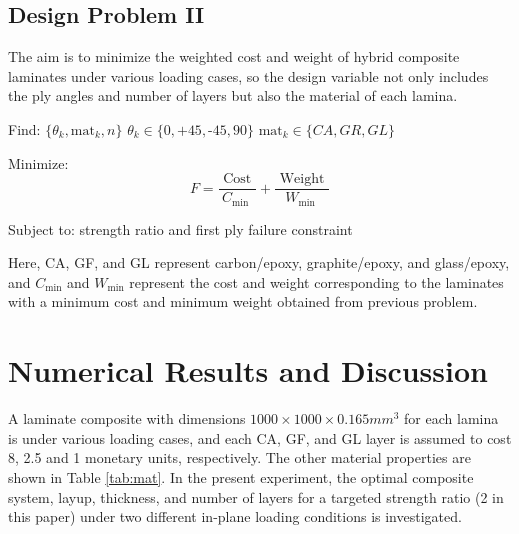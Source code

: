 \documentclass[USenglish]{article}
\begin{document}
\subsection{Design Problem II}
The aim is to minimize the weighted cost and weight of hybrid composite
laminates under various loading cases, so the design variable not only includes
the ply angles and number of layers but also the material of each lamina.


Find: $\{\theta_k,\text{mat}_k, n\}$ $\theta_k \in \{ 0,\text{+}45,\text{-}45,90\}$ $\text{mat}_k \in \{CA, GR, GL \}$

Minimize:
\begin{equation}
	F=\frac{\text { Cost }}{C_{\text {min }}}+\frac{\text { Weight }}{W_{\text {min }}}
\end{equation}

Subject to: strength ratio and first ply failure constraint


Here, CA, GF, and GL represent carbon/epoxy, graphite/epoxy, and glass/epoxy, and
$C_{\text{min}}$ and $W_{\text{min}}$ represent the cost and
weight corresponding to the laminates with a minimum cost and minimum weight
obtained from previous problem.

\section{Numerical Results and Discussion}
A laminate composite with dimensions $1000 \times 1000 \times 0.165 mm^3$ for
each lamina is under various loading cases, and each CA, GF, and GL layer is
assumed to cost 8, 2.5 and 1 monetary units, respectively. The other
material properties are shown in Table \ref{tab:mat}. In the present
experiment, the optimal composite system, layup, thickness, and number of
layers for a targeted strength ratio (2 in this paper) under two different
in-plane loading conditions is investigated.
\end{document}
